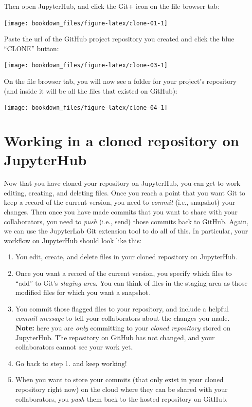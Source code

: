 \documentclass[
]{krantz}
\providecommand{\tightlist}{%
  \setlength{\itemsep}{0pt}\setlength{\parskip}{0pt}}
\begin{document}
Then open JupyterHub, and click the Git+ icon on the file browser tab:

\texttt{[image: bookdown\_files/figure-latex/clone-01-1]}

Paste the url of the GitHub project repository you
created and click the blue ``CLONE'' button:

\texttt{[image: bookdown\_files/figure-latex/clone-03-1]}

On the file browser tab, you will now see a folder for your project's repository
(and inside it will be all the files that existed on GitHub):

\texttt{[image: bookdown\_files/figure-latex/clone-04-1]}

\hypertarget{working-in-a-cloned-repository-on-jupyterhub}{%
\section{Working in a cloned repository on JupyterHub}\label{working-in-a-cloned-repository-on-jupyterhub}}

Now that you have cloned your repository on JupyterHub, you can get to work
editing, creating, and deleting files. Once you reach a point that you want
Git to keep a record of the current version, you need to \emph{commit} (i.e., snapshot) your changes.
Then once you have made commits that you want to share with your collaborators,
you need to \emph{push} (i.e., send) those commits back to GitHub.
Again, we can use the JupyterLab Git extension tool
to do all of this. In particular, your workflow on JupyterHub should look like this:

\begin{enumerate}
\def\labelenumi{\arabic{enumi}.}
\tightlist
\item
  You edit, create, and delete files in your cloned repository on JupyterHub.
\item
  Once you want a record of the current version, you specify which files to ``add'' to Git's \emph{staging area}. You can think of files in the staging area as
  those modified files for which you want a snapshot.
\item
  You commit those flagged files to your repository, and include a helpful \emph{commit message} to tell your collaborators about the changes
  you made. \textbf{Note:} here you are \emph{only} committing to your \emph{cloned repository} stored on JupyterHub. The repository on GitHub has not changed, and your collaborators
  cannot see your work yet.
\item
  Go back to step 1. and keep working!
\item
  When you want to store your commits (that only exist in your cloned repository right now) on the cloud where they can be shared with your collaborators, you \emph{push} them
  back to the hosted repository on GitHub.
\end{enumerate}
\end{document}
